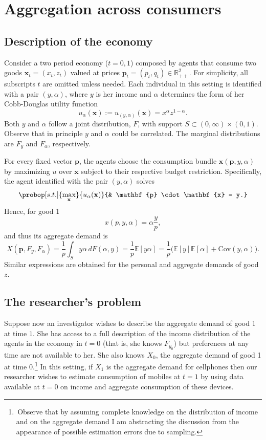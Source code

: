 \documentclass[english, a4paper, 12pt]{article}
\begin{document}
\section{Aggregation across consumers} \label{sec:RepAg}

\subsection{Description of the economy} \label{ssec:RepAgDescr}
Consider a two period economy ($t = 0,1$) composed by agents that consume two goods $\mathbf{x}_{t} = (x_{t}, z_{t})$ valued at prices $\mathbf{p}_{t} = (p_{t}, q_{t}) \in \mathbb{R}^{2}_{++}$. For simplicity, all subscripts $t$ are omitted unless needed. Each individual in this setting is identified with a pair $(y,\alpha)$, where $y$ is her income and $\alpha$ determines the form of her Cobb-Douglas utility function
	$$u_{\alpha}(\mathbf{x}) := u_{(y,\alpha)}(\mathbf{x}) = x^{\alpha}z^{1-\alpha}.$$
Both $y$ and $\alpha$ follow a joint distribution, $F$, with support $S \subset (0,\infty) \times (0,1)$. Observe that in principle $y$ and $\alpha$ could be correlated. The marginal distributions are $F_{y}$ and $F_{\alpha}$, respectively. 

For every fixed vector $\mathbf{p}$, the agents choose the consumption bundle $\mathbf{x}(\mathbf{p}, y, \alpha)$ by maximizing $u$ over $\mathbf{x}$ subject to their respective budget restriction. Specifically, the agent identified with the pair $(y,\alpha)$ solves
	$$\probop[s.t.]{\max_{\mathbf{x}}}{u_{\alpha}(\mathbf{x})}
							{&	\mathbf{p} \cdot \mathbf{x} = y.}$$ 
Hence, for good 1
	$$x(p, y, \alpha) = \alpha \frac{y}{p},$$
and thus its aggregate demand is
	$$X(\mathbf{p}, F_{y}, F_{\alpha})
		= \frac{1}{p} \int_{S} y\alpha \,dF(\alpha,y)
		= \frac{1}{p}\mathbb{E}[y\alpha]
		= \frac{1}{p}\Big(\mathbb{E}[y]\mathbb{E}[\alpha] + \mathrm{Cov}(y,\alpha)\Big).
	$$
Similar expressions are obtained for the personal and aggregate demands of good $z$.

\subsection{The researcher's problem} \label{ssec:RepAgProblem}
Suppose now an investigator wishes to describe the aggregate demand of good 1 at time $1$. She has access to a full description of the income distribution of the agents in the economy in $t = 0$ (that is, she knows $F_{y_{0}}$) but preferences at any time are not available to her. She also knows $X_{0}$, the aggregate demand of good 1 at time $0$.\footnote{\,Observe that by assuming complete knowledge on the distribution of income and on the aggregate demand I am abstracting the discussion from the appearance of possible estimation errors due to sampling.} In this setting, if $X_{1}$ is the aggregate demand for cellphones then our researcher wishes to estimate consumption of mobiles at $t=1$ by using data available at $t=0$ on income and aggregate consumption of these devices.
\end{document}
